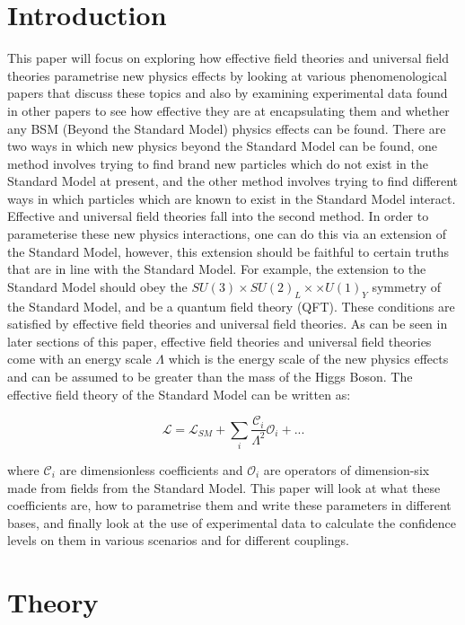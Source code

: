\documentclass[11pt,oneside,a4paper]{article}
\begin{document}
\section{Introduction}
This paper will focus on exploring how effective field theories and universal field theories parametrise new physics effects by looking at various phenomenological papers that discuss these topics and also by examining experimental data found in other papers to see how effective they are at encapsulating them and whether any BSM (Beyond the Standard Model) physics effects can be found. There are two ways in which new physics beyond the Standard Model can be found, one method involves trying to find brand new particles which do not exist in the Standard Model at present, and the other method involves trying to find different ways in which particles which are known to exist in the Standard Model interact. Effective and universal field theories fall into the second method. In order to parameterise these new physics interactions, one can do this via an extension of the Standard Model, however, this extension should be faithful to certain truths that are in line with the Standard Model. For example, the extension to the Standard Model should obey the $SU(3) \times SU(2)_{L} ×\times U(1)_{Y}$ symmetry of the Standard Model, and be a quantum field theory (QFT). These conditions are satisfied by effective field theories and universal field theories. As can be seen in later sections of this paper, effective field theories and universal field theories come with an energy scale $\Lambda$ which is the energy scale of the new physics effects and can be assumed to be greater than the mass of the Higgs Boson. The effective field theory of the Standard Model can be written as:

\begin{equation}
\mathcal{L} = \mathcal{L}_{SM} + \sum_{i}^{}\frac{\mathcal{C}_{i}}{\Lambda^{2}}\mathcal{O}_{i}+...
\end{equation}

where $\mathcal{C}_{i}$ are dimensionless coefficients and $\mathcal{O}_{i}$ are operators of dimension-six made from fields from the Standard Model. This paper will look at what these coefficients are, how to parametrise them and write these parameters in different bases, and finally look at the use of experimental data to calculate the confidence levels on them in various scenarios and for different couplings.

\section{Theory}
\end{document}
